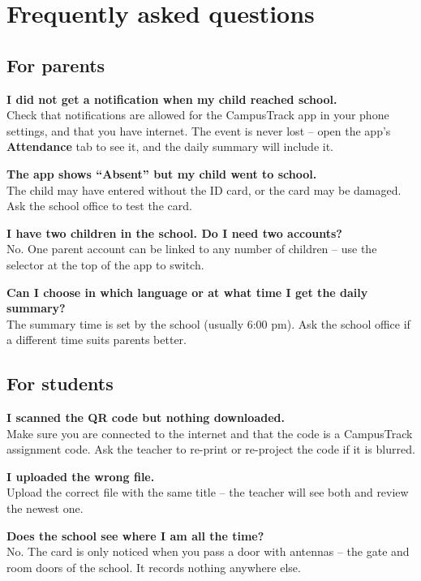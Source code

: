 \chapter{Frequently asked questions}

\section*{For parents}

\textbf{I did not get a notification when my child reached school.}\\
Check that notifications are allowed for the CampusTrack app in your
phone settings, and that you have internet. The event is never lost --
open the app's \textbf{Attendance} tab to see it, and the daily summary
will include it.

\textbf{The app shows ``Absent'' but my child went to school.}\\
The child may have entered without the ID card, or the card may be
damaged. Ask the school office to test the card.

\textbf{I have two children in the school. Do I need two accounts?}\\
No. One parent account can be linked to any number of children -- use
the selector at the top of the app to switch.

\textbf{Can I choose in which language or at what time I get the daily
summary?}\\
The summary time is set by the school (usually 6:00 pm). Ask the school
office if a different time suits parents better.

\section*{For students}

\textbf{I scanned the QR code but nothing downloaded.}\\
Make sure you are connected to the internet and that the code is a
CampusTrack assignment code. Ask the teacher to re-print or re-project
the code if it is blurred.

\textbf{I uploaded the wrong file.}\\
Upload the correct file with the same title -- the teacher will see
both and review the newest one.

\textbf{Does the school see where I am all the time?}\\
No. The card is only noticed when you pass a door with antennas -- the
gate and room doors of the school. It records nothing anywhere else.

